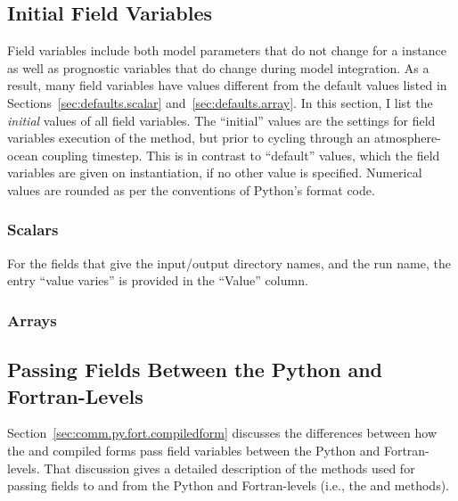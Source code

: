 	\subsection{Initial Field Variables}  \label{sec:initial.variables}

Field variables include both model parameters that do not change
for a  instance as well as prognostic variables that
do change during model integration.  As a result, many field variables
have values different from the default values listed in
Sections~\ref{sec:defaults.scalar} and~\ref{sec:defaults.array}.
In this section, I list the \emph{initial} values of all field
variables.  The ``initial'' values are the settings for 
field variables execution of the  method, but
prior to cycling through an atmosphere-ocean coupling timestep.
This is in contrast to ``default'' values, which the field variables
are given on instantiation, if no other value is specified.
Numerical values are rounded as per the conventions
of Python's  format code.


		\subsubsection{Scalars}

For the fields that give the input/output directory names, and the
run name, the entry ``value varies'' is provided in the ``Value''
column.



		\subsubsection{Arrays}




	\subsection{Passing Fields Between the Python and Fortran-Levels}

Section~\ref{sec:comm.py.fort.compiledform} discusses the differences
between how the  and  compiled forms
pass field variables between the Python and Fortran-levels.  That
discussion gives a detailed description of the methods used for
passing fields to and from the Python and Fortran-levels (i.e., the
 and  methods).

